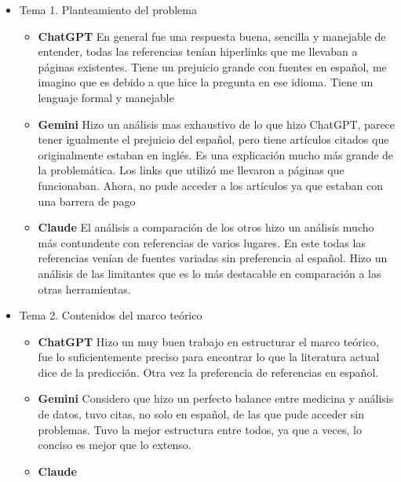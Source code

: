 \documentclass{article}
\begin{document}
\begin{itemize}
    \item Tema 1. Planteamiento del problema
        \begin{itemize}
        \item \textbf{ChatGPT}
            En general fue una respuesta buena, sencilla y
            manejable de entender, todas las referencias
            tenían hiperlinks que me llevaban a páginas
            existentes. Tiene un prejuicio grande con fuentes
            en español, me imagino que es debido a que hice
            la pregunta en ese idioma. Tiene un lenguaje
            formal y manejable
        \item \textbf{Gemini}
            Hizo un análisis mas exhaustivo de lo que hizo
            ChatGPT, parece tener igualmente el
            prejuicio del español, pero tiene artículos
            citados que originalmente estaban en inglés. Es
            una explicación mucho más grande de la
            problemática. Los links que utilizó me llevaron
            a páginas que funcionaban. Ahora, no pude
            acceder a los artículos ya que estaban con una
            barrera de pago
        \item \textbf{Claude}
            El análisis a comparación de los otros hizo un
            análisis mucho más contundente con referencias
            de varios lugares. En este todas las referencias
            venían de fuentes variadas sin preferencia al
            español. Hizo un análisis de las limitantes que
            es lo más destacable en comparación a las otras
            herramientas.
        \end{itemize}
    \item Tema 2. Contenidos del marco teórico
        \begin{itemize}
        \item \textbf{ChatGPT}
            Hizo un muy buen trabajo en estructurar el marco
            teórico, fue lo suficientemente preciso para
            encontrar lo que la literatura actual dice de la
            predicción. Otra vez la preferencia de
            referencias en español.
        \item \textbf{Gemini}
            Considero que hizo un perfecto balance entre
            medicina y análisis de datos, tuvo citas, no solo
            en español, de las que pude acceder sin
            problemas. Tuvo la mejor estructura entre todos,
            ya que a veces, lo conciso es mejor que lo
            extenso.
        \item \textbf{Claude}

\end{itemize}
\end{itemize}
\end{document}
